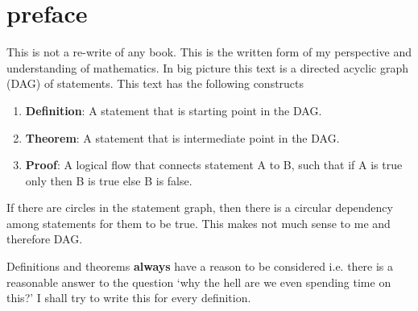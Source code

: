 \documentclass[./main.tex]{subfiles}
\begin{document}
\chapter*{preface}
This is not a re-write of any book.
This is the written form of my perspective and understanding of mathematics.
In big picture this text is a directed acyclic graph (DAG) of statements.
This text has the following constructs
\begin{enumerate}
  \item \textbf{Definition}: A statement that is starting point in the DAG.
  \item \textbf{Theorem}: A statement that is intermediate point in the DAG.
  \item \textbf{Proof}: A logical flow that connects statement A to B, such that if A is true only then B is true else B is false.
\end{enumerate}

If there are circles in the statement graph, then there is a circular dependency among statements for them to be true. This makes not much sense to me and therefore DAG.

Definitions and theorems \textbf{always} have a reason to be considered i.e. there is a reasonable answer to the question `why the hell are we even spending time on this?' I shall try to write this for every definition.
\end{document}
